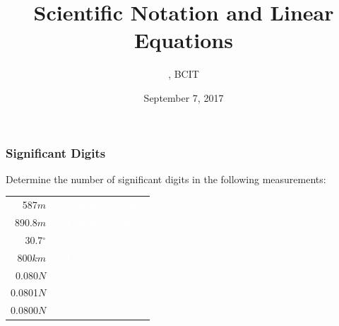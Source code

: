 \documentclass[xcolor=dvipsnames]{beamer}
\title{Scientific Notation and Linear Equations}
\subtitle{{\CourseNumber}, BCIT}
\author{\CourseName}
\date{September 7, 2017}
\begin{document}
\begin{frame}
  \titlepage
\end{frame}

\begin{frame}
  \frametitle{Significant Digits}
  Determine the number of significant digits in the following
  measurements:

\bigskip

  \begin{tabular}{rcl}
    587$m$ & \hspace{.5in} & \textcolor{white}{3 significant digits} \\
    890.8$m$ & \hspace{.5in} & \textcolor{white}{4 significant digits} \\
    30.7$^{\circ}$ & \hspace{.5in} & \textcolor{white}{3 significant digits} \\
    800$km$ & \hspace{.5in} & \textcolor{white}{1 significant digit} \\
    0.080$N$ & \hspace{.5in} & \textcolor{white}{2 significant digits} \\
    0.0801$N$ & \hspace{.5in} & \textcolor{white}{3 significant digits} \\
    0.0800$N$ & \hspace{.5in} & \textcolor{white}{3 significant digits} \\
  \end{tabular}
\end{frame}
\end{document}
